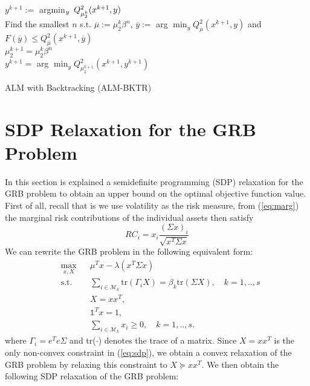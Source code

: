 {\begin{algorithm}
{$y^{k+1} :=$ argmin$_y \hspace{0.5em} Q^2_{\mu_2^k}(x^{k+1},y)$\\
{
Find the smallest $n$ s.t. $\overline{\mu} := \mu_2^k\beta^n$,  $\overline{y}:=$ arg $\min_y Q^2_{\overline{\mu}}(x^{k+1},y)$ and $F(\overline{y}) \leq Q^2_{\overline{\mu}}(x^{k+1},\overline{y})$\\
$\mu_2^{k+1} = \mu_2^k \beta^n$\\
$y^{k+1} =$  arg $\min_y Q^2_{\mu_2^{k+1}}(x^{k+1},y^{k+1})$
}
}
\caption{ALM with Backtracking (ALM-BKTR)}
\label{alg:almbktr}
\end{algorithm}


\section{SDP Relaxation for the GRB Problem}
In this section is explained a semidefinite programming (SDP) relaxation for the GRB problem to obtain an upper bound on the optimal objective function value. First of all, recall that is we use volatility as the risk measure, from (\ref{eq:marg}) the marginal risk contributions of the individual assets then satisfy
\begin{equation}
RC_i= x_i \frac{(\Sigma x)_i}{\sqrt{x^T \Sigma x}}
\end{equation}
We can rewrite the GRB problem in the following equivalent form:
\begin{equation}\label{eq:sdp}
\begin{aligned}
& \underset{x,X}{\text{max}}
& & \mu^Tx - \lambda(x^T\Sigma x) \\
& \text{s.t.}
&& \sum_{i \in \mathcal{M}_k} \mbox{tr}(\Gamma_i X) = \beta_k \mbox{tr}(\Sigma X), \quad k=1,..,s \\
&&&X = xx^T,\\
&&&\mathds{1}^T x = 1,\\
&&&\sum_{i \in \mathcal{M}_k} x_i \geq 0, \quad k=1,..,s.
\end{aligned}
\end{equation}
where $\Gamma_i = e^T e \Sigma$ and tr($\cdot$) denotes the trace of a matrix. Since $X = x x^T$ is the only non-convex constraint in (\ref{eq:sdp}), we obtain a convex relaxation of the GRB problem by relaxing this constraint to $X \succeq  x x^T$. We then obtain the following SDP relaxation of the GRB problem:
\begin{equation}
\begin{aligned}

\end{aligned}
\end{equation}}

